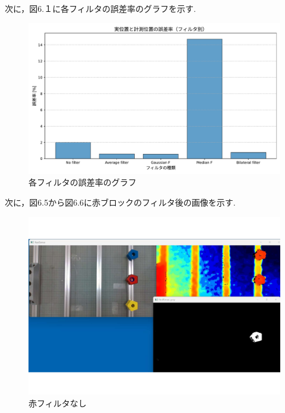 次に，図6.１に各フィルタの誤差率のグラフを示す.

\begin{figure}[H]
  \centering
  \includegraphics[scale=0.7]{sozai/gurafu.pdf}
  \caption{各フィルタの誤差率のグラフ}
\end{figure}

次に，図6.5から図6.6に赤ブロックのフィルタ後の画像を示す.

\begin{figure}[H]
  \centering
  \includegraphics[scale=0.5]{sozai/a.pdf}
  \caption{赤フィルタなし}
\end{figure}

